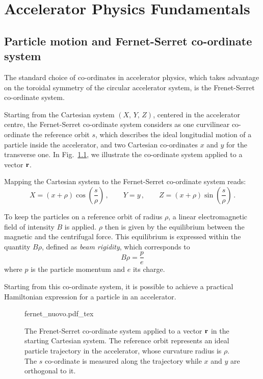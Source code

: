 
\chapter{Accelerator Physics Fundamentals}\label{ch:accelerator_physics_fundamentals}

\section{Particle motion and Fernet-Serret co-ordinate system}

The standard choice of co-ordinates in accelerator physics, which takes advantage on the toroidal symmetry of the circular accelerator system, is the Frenet-Serret co-ordinate system.

Starting from the Cartesian system $(X,\, Y,\, Z)$, centered in the accelerator centre, the Fernet-Serret co-ordinate system considers as one curvilinear co-ordinate the reference orbit $s$, which describes the ideal longitudial motion of a particle inside the accelerator, and two Cartesian co-ordinates $x$ and $y$ for the transverse one. In Fig.~\ref{fig:frenserr}, we illustrate the co-ordinate system applied to a vector $\vb{r}$.

Mapping the Cartesian system to the Fernet-Serret co-ordinate system reads:
%
\begin{equation} 
    X = (x+\rho)\cos(\frac{s}{\rho})\,, \qquad Y=y\,, \qquad Z=(x+\rho)\sin(\frac{s}{\rho})\,.
\end{equation}

To keep the particles on a reference orbit of radius $\rho$, a linear electromagnetic field of intensity $B$ is applied. $\rho$ then is given by the equilibrium between the magnetic and the centrifugal force. This equilibrium is expressed within the quantity $B\rho$, defined as \textit{beam rigidity}, which corresponds to
\begin{equation}
    B\rho = \frac{p}{e}
    \label{eq:beam_rigidity}
\end{equation}
where $p$ is the particle momentum and $e$ its charge.

Starting from this co-ordinate system, it is possible to achieve a practical Hamiltonian expression for a particle in an accelerator.

\begin{figure}
\centering
\def\svgwidth{0.75\columnwidth}
{fernet_nuovo.pdf_tex}
\caption{The Frenet-Serret co-ordinate system applied to a vector $\vb{r}$ in the starting Cartesian system. The reference orbit represents an ideal particle trajectory in the accelerator, whose curvature radius is $\rho$. The $s$ co-ordinate is measured along the trajectory while $x$ and $y$ are orthogonal to it.}
\label{fig:frenserr}
\end{figure}

